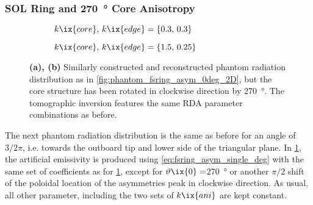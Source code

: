             \subsubsection*{SOL Ring and \SI{270}{\degree} Core Anisotropy}%
%
                \begin{figure}[t]%
                    \centering%
                    \begin{subfigure}{\textwidth}%
                        \centering%
                        \caption{$k\ix{core},\,k\ix{edge}=\left\{0.3,\,0.3\right\}$}%
                    \end{subfigure}%
                    \newline%
                    \begin{subfigure}{\textwidth}%
                        \centering%
                        \caption{$k\ix{core},\,k\ix{edge}=\left\{1.5,\,0.25\right\}$}%
                    \end{subfigure}%
                    \caption{\textbf{(a), (b)} Similarly constructed and reconstructed phantom radiation distribution as in \cref{fig:phantom_fsring_asym_0deg_2D}, but the core structure has been rotated in clockwise direction by \SI{270}{\degree}. The tomographic inversion features the same RDA parameter combinations as before.}\label{fig:phantom_fsring_asym_270deg_2D}%
                \end{figure}%
%
                The next phantom radiation distribution is the same as before for an angle of $3/2\pi$, i.e. towards the outboard tip and lower side of the triangular plane. In \cref{fig:phantom_fsring_asym_270deg_2D}, the artificial emissivity is produced using \cref{eq:fsring_asym_single_deg} with the same set of coefficients as for \cref{fig:phantom_fsring_asym_270deg_2D}, except for $\vartheta\ix{0}=$\SI{270}{\degree} or another $\pi/2$ shift of the poloidal location of the asymmetries peak in clockwise direction. As usual, all other parameter, including the two sets of $k\ix{ani}$ are kept constant.\\%
